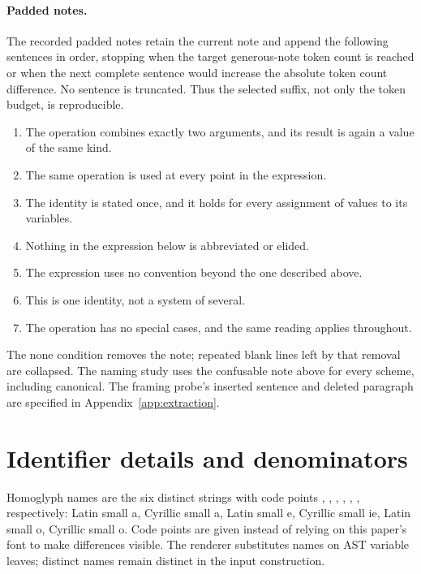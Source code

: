 \documentclass{article}
\newcommand{\code}[1]{\texttt{\detokenize{#1}}}
\begin{document}
\paragraph{Padded notes.}
The recorded padded notes retain the current note and append the following
sentences in order, stopping when the target generous-note token count is
reached or when the next complete sentence would increase the absolute token
count difference. No sentence is truncated. Thus the selected suffix, not only
the token budget, is reproducible.
\begin{enumerate}
\item The operation combines exactly two arguments, and its result is again a value of the same kind.
\item The same operation is used at every point in the expression.
\item The identity is stated once, and it holds for every assignment of values to its variables.
\item Nothing in the expression below is abbreviated or elided.
\item The expression uses no convention beyond the one described above.
\item This is one identity, not a system of several.
\item The operation has no special cases, and the same reading applies throughout.
\end{enumerate}

The none condition removes the note; repeated blank lines left by that removal
are collapsed. The naming study uses the confusable note above for every
scheme, including canonical. The framing probe's inserted sentence and deleted
paragraph are specified in Appendix~\ref{app:extraction}.

\section{Identifier details and denominators}
\label{app:naming}

Homoglyph names are the six distinct strings with code points
\code{U+0061}, \code{U+0430}, \code{U+0065}, \code{U+0435},
\code{U+006F}, \code{U+043E}, respectively: Latin small a, Cyrillic small a,
Latin small e, Cyrillic small ie, Latin small o, Cyrillic small o. Code points
are given instead of relying on this paper's font to make differences visible.
The renderer substitutes names on AST variable leaves; distinct names remain
distinct in the input construction.
\end{document}
